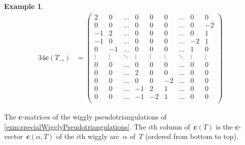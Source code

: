 \documentclass{amsart}
\theoremstyle{definition}
\newtheorem{example}[theorem]{Example}
\renewcommand{\b}[1]{{\boldsymbol{#1}}} %
\begin{document}
\begin{example}
\begin{table}
\begin{alignat*}{3}
	4\b{c}(T_\rightarrow) & = \begin{pmatrix}
		2 & 0 & \dots & 0 & 0 & 0 & \dots & 0 & 0 \\
		0 & 0 & \dots & 0 & 0 & 0 & \dots & 0 & -2 \\
		-1 & 2 & \dots & 0 & 0 & 0 & \dots & 0 & 1 \\
		-1 & 0 & \dots & 0 & 0 & 0 & \dots & -2 & 1 \\
		0 & -1 & \dots & 0 & 0 & 0 & \dots & 1 & 0 \\
		\vdots & \vdots & \ddots & \vdots & \vdots & \vdots & \ddots & \vdots & \vdots \\
		0 & 0 & \dots & 0 & 0 & 0 & \dots & 0 & 0 \\
		0 & 0 & \dots & 2 & 0 & 0 & \dots & 0 & 0 \\
		0 & 0 & \dots & 0 & 0 & -2 & \dots & 0 & 0 \\
		0 & 0 & \dots & -1 & 2 & 1 & \dots & 0 & 0 \\
		0 & 0 & \dots & -1 & -2 & 1 & \dots & 0 & 0 \\
	\end{pmatrix}
	\end{alignat*}
	\endgroup
	\caption{The $\b{c}$-matrices of the wiggly pseudotriangulations of \cref{exm:specialWigglyPseudotriangulations}. The $i$th column of~$\b{c}(T)$ is the $\b{c}$-vector~$\b{c}(\alpha, T)$ of the $i$th wiggly arc~$\alpha$ of~$T$ (ordered from bottom to top).}
	\label{table:specialCMatrices}
\end{table}
\end{example}
\end{document}
